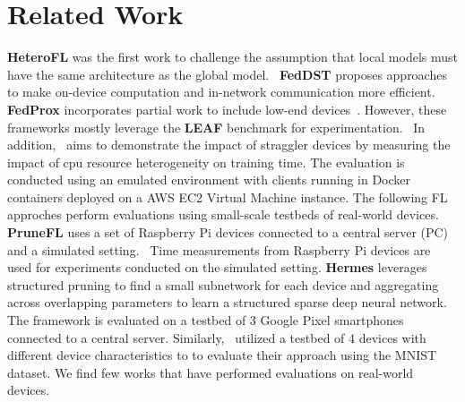 \section{Related Work}
    \textbf{HeteroFL} was the first work to challenge the assumption that local models must have the same architecture as the global model.~\cite{DBLP:journals/corr/abs-2010-01264} \textbf{FedDST} proposes approaches to make on-device computation and in-network communication more efficient.~\cite{DBLP:journals/corr/abs-2112-09824} \textbf{FedProx} incorporates partial work to include low-end devices~\cite{DBLP:journals/corr/abs-1812-06127}. However, these frameworks mostly leverage the \textbf{LEAF} benchmark for experimentation.~\cite{DBLP:journals/corr/abs-1812-01097} In addition,~\cite{232971} aims to demonstrate the impact of straggler devices by measuring the impact of cpu resource heterogeneity on training time. The evaluation is conducted using an emulated environment with clients running in Docker containers deployed on a AWS EC2 Virtual Machine instance. The following FL approches perform evaluations using small-scale testbeds of real-world devices. \textbf{PruneFL} uses a set of Raspberry Pi devices connected to a central server (PC) and a simulated setting.~\cite{9762360} Time measurements from Raspberry Pi devices are used for experiments conducted on the simulated setting. \textbf{Hermes} leverages structured pruning to find a small subnetwork for each device and aggregating across overlapping parameters to learn a structured sparse deep neural network.~\cite{10.1145/3447993.3483278} The framework is evaluated on a testbed of 3 Google Pixel smartphones connected to a central server. Similarly,~\cite{9139810} utilized a testbed of 4 devices with different device characteristics to to evaluate their approach using the MNIST dataset. We find few works that have performed evaluations on real-world devices.

